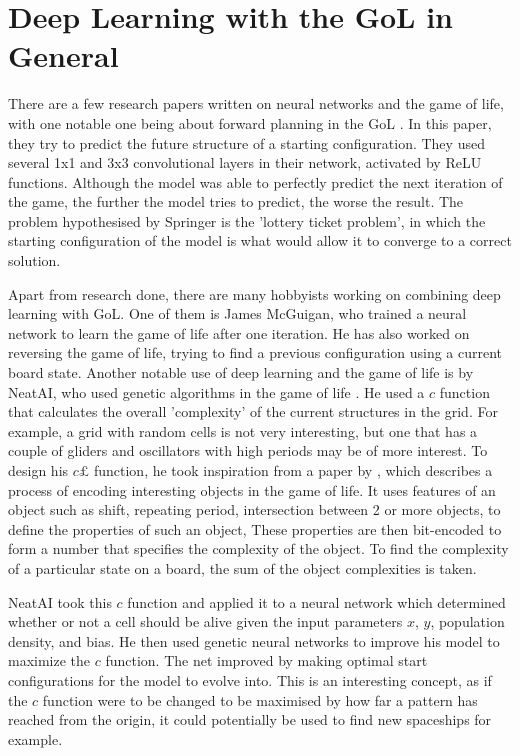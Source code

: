 \documentclass{l4proj}
\begin{document}
\section{Deep Learning with the GoL in General}

There are a few research papers written on neural networks and the game of life, with one notable one being about forward planning in the GoL \cite{game_of_life_dl_is_hard}. In this paper, they try to predict the future structure of a starting configuration. They used several 1x1 and 3x3 convolutional layers in their network, activated by ReLU functions. Although the model was able to perfectly predict the next iteration of the game, the further the model tries to predict, the worse the result. The problem hypothesised by Springer is the 'lottery ticket problem', in which the starting configuration of the model is what would allow it to converge to a correct solution. 

Apart from research done, there are many hobbyists working on combining deep learning with GoL. One of them is James McGuigan, who trained a neural network to learn the game of life after one iteration. He has also worked on reversing the game of life, trying to find a previous configuration using a current board state. Another notable use of deep learning and the game of life is by NeatAI, who used genetic algorithms in the game of life \cite{neatai_gol}. He used a $c$ function that calculates the overall 'complexity' of the current structures in the grid. For example, a grid with random cells is not very interesting, but one that has a couple of gliders and oscillators with high periods may be of more interest. To design his $c£$ function, he took inspiration from a paper by \cite{algorithmic_specified_complexity}, which describes a process of encoding interesting objects in the game of life. It uses features of an object such as shift, repeating period, intersection between 2 or more objects, to define the properties of such an object, These properties are then bit-encoded to form a number that specifies the complexity of the object. To find the complexity of a particular state on a board, the sum of the object complexities is taken.

NeatAI took this $c$ function and applied it to a neural network which determined whether or not a cell should be alive given the input parameters $x$, $y$, population density, and bias. He then used genetic neural networks to improve his model to maximize the $c$ function. The net improved by making optimal start configurations for the model to evolve into. This is an interesting concept, as if the $c$ function were to be changed to be maximised by how far a pattern has reached from the origin, it could potentially be used to find new spaceships for example.
\end{document}
